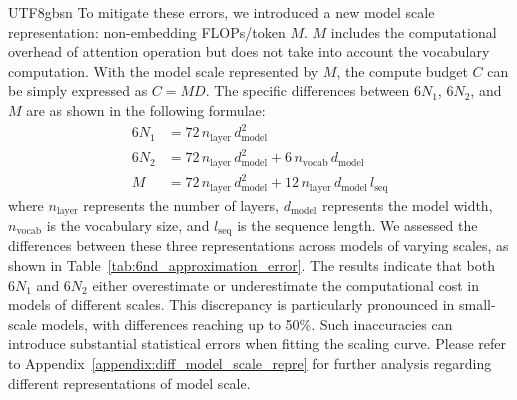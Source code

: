 \documentclass[11pt, a4paper, logo, copyright, nonumbering]{deepseek}
\begin{document}
\begin{CJK*}{UTF8}{gbsn}
To mitigate these errors, we introduced a new model scale representation: non-embedding FLOPs/token $M$. $M$ includes the computational overhead of attention operation but does not take into account the vocabulary computation. With the model scale represented by $M$, the compute budget $C$ can be simply expressed as $C=MD$. The specific differences between $6N_1$, $6N_2$, and $M$ are as shown in the following formulae:
\begin{equation}
\label{eqa:diff_model_scale}
\begin{aligned}
    6N_1 &= 72\,n_{\mathrm{layer}}\,d_{\mathrm{model}}^2 \\
    6N_2 &= 72\,n_{\mathrm{layer}}\,d_{\mathrm{model}}^2 + 6\,n_{\mathrm{vocab}}\,d_{\mathrm{model}} \\
    M &= 72\,n_{\mathrm{layer}}\,d_{\mathrm{model}}^2 + 12\,n_{\mathrm{layer}}\,d_{\mathrm{model}}\,l_{\mathrm{seq}}
\end{aligned}
\end{equation}
where $n_{\mathrm{layer}}$ represents the number of layers, $d_{\mathrm{model}}$ represents the model width, $n_{\mathrm{vocab}}$ is the vocabulary size, and $l_{\mathrm{seq}}$ is the sequence length. We assessed the differences between these three representations across models of varying scales, as shown in Table~\ref{tab:6nd_approximation_error}. The results indicate that both $6N_1$ and $6N_2$ either overestimate or underestimate the computational cost in models of different scales. This discrepancy is particularly pronounced in small-scale models, with differences reaching up to 50\%. Such inaccuracies can introduce substantial statistical errors when fitting the scaling curve. Please refer to Appendix~\ref{appendix:diff_model_scale_repre} for further analysis regarding different representations of model scale.


\end{CJK*}
\end{document}
